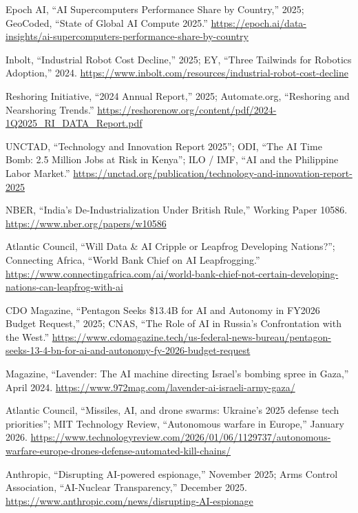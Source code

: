 \documentclass[11pt,a4paper]{article}
\begin{document}
\noindent [59] Epoch AI, ``AI Supercomputers Performance Share by Country,'' 2025; GeoCoded, ``State of Global AI Compute 2025.'' \url{https://epoch.ai/data-insights/ai-supercomputers-performance-share-by-country}

\noindent [60] Inbolt, ``Industrial Robot Cost Decline,'' 2025; EY, ``Three Tailwinds for Robotics Adoption,'' 2024. \url{https://www.inbolt.com/resources/industrial-robot-cost-decline}

\noindent [61] Reshoring Initiative, ``2024 Annual Report,'' 2025; Automate.org, ``Reshoring and Nearshoring Trends.'' \url{https://reshorenow.org/content/pdf/2024-1Q2025_RI_DATA_Report.pdf}

\noindent [62] UNCTAD, ``Technology and Innovation Report 2025''; ODI, ``The AI Time Bomb: 2.5 Million Jobs at Risk in Kenya''; ILO / IMF, ``AI and the Philippine Labor Market.'' \url{https://unctad.org/publication/technology-and-innovation-report-2025}

\noindent [63] NBER, ``India's De-Industrialization Under British Rule,'' Working Paper 10586. \url{https://www.nber.org/papers/w10586}

\noindent [64] Atlantic Council, ``Will Data \& AI Cripple or Leapfrog Developing Nations?''; Connecting Africa, ``World Bank Chief on AI Leapfrogging.'' \url{https://www.connectingafrica.com/ai/world-bank-chief-not-certain-developing-nations-can-leapfrog-with-ai}

\noindent [65] CDO Magazine, ``Pentagon Seeks \$13.4B for AI and Autonomy in FY2026 Budget Request,'' 2025; CNAS, ``The Role of AI in Russia's Confrontation with the West.'' \url{https://www.cdomagazine.tech/us-federal-news-bureau/pentagon-seeks-13-4-bn-for-ai-and-autonomy-fy-2026-budget-request}

 Magazine, ``Lavender: The AI machine directing Israel's bombing spree in Gaza,'' April 2024. \url{https://www.972mag.com/lavender-ai-israeli-army-gaza/}

\noindent [67] Atlantic Council, ``Missiles, AI, and drone swarms: Ukraine's 2025 defense tech priorities''; MIT Technology Review, ``Autonomous warfare in Europe,'' January 2026. \url{https://www.technologyreview.com/2026/01/06/1129737/autonomous-warfare-europe-drones-defense-automated-kill-chains/}

\noindent [68] Anthropic, ``Disrupting AI-powered espionage,'' November 2025; Arms Control Association, ``AI-Nuclear Transparency,'' December 2025. \url{https://www.anthropic.com/news/disrupting-AI-espionage}
\end{document}
